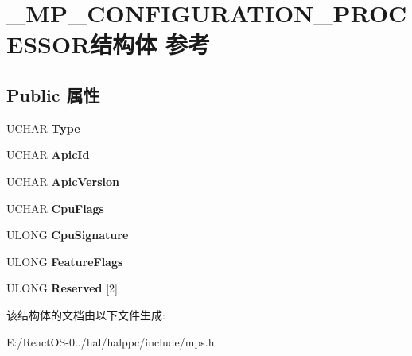 \hypertarget{struct___m_p___c_o_n_f_i_g_u_r_a_t_i_o_n___p_r_o_c_e_s_s_o_r}{}\section{\+\_\+\+M\+P\+\_\+\+C\+O\+N\+F\+I\+G\+U\+R\+A\+T\+I\+O\+N\+\_\+\+P\+R\+O\+C\+E\+S\+S\+O\+R结构体 参考}
\label{struct___m_p___c_o_n_f_i_g_u_r_a_t_i_o_n___p_r_o_c_e_s_s_o_r}
\subsection*{Public 属性}
\begin{DoxyCompactItemize}
\item 
\mbox{\label{struct___m_p___c_o_n_f_i_g_u_r_a_t_i_o_n___p_r_o_c_e_s_s_o_r_a46fb9b93da927891676ed73f13c17832}} 
U\+C\+H\+AR {\bfseries Type}
\item 
\mbox{\label{struct___m_p___c_o_n_f_i_g_u_r_a_t_i_o_n___p_r_o_c_e_s_s_o_r_a53a1bb9be6f3231c344f044ccea6b18a}} 
U\+C\+H\+AR {\bfseries Apic\+Id}
\item 
\mbox{\label{struct___m_p___c_o_n_f_i_g_u_r_a_t_i_o_n___p_r_o_c_e_s_s_o_r_a2ca656d1f68d032f188044501869793e}} 
U\+C\+H\+AR {\bfseries Apic\+Version}
\item 
\mbox{\label{struct___m_p___c_o_n_f_i_g_u_r_a_t_i_o_n___p_r_o_c_e_s_s_o_r_ab6752468c62f715f27d81d92541b82a1}} 
U\+C\+H\+AR {\bfseries Cpu\+Flags}
\item 
\mbox{\label{struct___m_p___c_o_n_f_i_g_u_r_a_t_i_o_n___p_r_o_c_e_s_s_o_r_a8a5280032e085eda47d14a07d061b156}} 
U\+L\+O\+NG {\bfseries Cpu\+Signature}
\item 
\mbox{\label{struct___m_p___c_o_n_f_i_g_u_r_a_t_i_o_n___p_r_o_c_e_s_s_o_r_a251768d3d6ddd6b805303c90ff382c17}} 
U\+L\+O\+NG {\bfseries Feature\+Flags}
\item 
\mbox{\label{struct___m_p___c_o_n_f_i_g_u_r_a_t_i_o_n___p_r_o_c_e_s_s_o_r_a4fec2b7af0fa67b068bdb08e8d94c7d1}} 
U\+L\+O\+NG {\bfseries Reserved} \mbox{[}2\mbox{]}
\end{DoxyCompactItemize}


该结构体的文档由以下文件生成\+:\begin{DoxyCompactItemize}
\item 
E\+:/\+React\+O\+S-\/0../hal/halppc/include/mps.\+h\end{DoxyCompactItemize}
